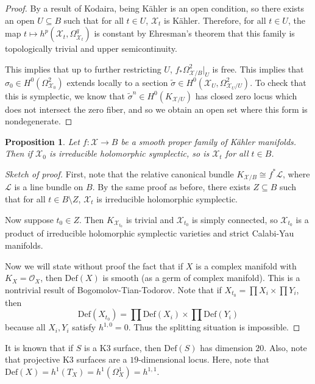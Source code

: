 \documentclass[leqno, openany]{memoir}
\newtheorem{prop}[thm]{Proposition}
\theoremstyle{definition}
\theoremstyle{remark}
\theoremstyle{plain}
\theoremstyle{definition}
\theoremstyle{remark}
\newcommand{\mc}[1]{\mathcal{#1}}
\newcommand{\mr}[1]{\mathrm{#1}}
\newcommand{\wt}[1]{\widetilde{#1}}
\begin{document}
\begin{proof}
    By a result of Kodaira, being K\"ahler is an open condition, so there exists an open $U \subseteq B$ such that for all $t \in U$, $\mc{X}_t$ is K\"ahler. Therefore, for all $t \in U$, the map $t \mapsto h^p(\mc{X}_t, \Omega_{\mc{X}_t}^q)$ is constant by Ehresman's theorem that this family is topologically trivial and upper semicontinuity.

    This implies that up to further restricting $U$, $f_* \Omega^2_{\mc{X}/B}|_U$ is free. This implies that $\sigma_0 \in H^0(\Omega^2_{\mc{X}_0})$ extends locally to a section $\wt{\sigma} \in H^0(\mc{X}_U, \Omega^2_{\mc{X}_U/U})$. To check that this is symplectic, we know that $\wt{\sigma}^n \in H^0(K_{\mc{X}/U})$ has closed zero locus which does not intersect the zero fiber, and so we obtain an open set where this form is nondegenerate.
\end{proof}

\begin{prop}
    Let $f \colon \mc{X} \to B$ be a smooth proper family of K\"ahler manifolds. Then if $\mc{X}_0$ is irreducible holomorphic symplectic, so is $\mc{X}_t$ for all $t \in B$.
\end{prop}

\begin{proof}[Sketch of proof]
    First, note that the relative canonical bundle $K_{\mc{X}/B} \cong f^* \mc{L}$, where $\mc{L}$ is a line bundle on $B$. By the same proof as before, there exists $Z \subseteq B$ such that for all $t \in B \setminus Z$, $\mc{X}_t$ is irreducible holomorphic symplectic.

    Now suppose $t_0 \in Z$. Then $K_{\mc{X}_{t_0}}$ is trivial and $\mc{X}_{t_0}$ is simply connected, so $\mc{X}_{t_0}$ is a product of irreducible holomorphic symplectic varieties and strict Calabi-Yau manifolds.

Now we will state without proof the fact that if $X$ is a complex manifold with $K_X = \mc{O}_X$, then $\mr{Def}(X)$ is smooth (as a germ of complex manifold). This is a nontrivial result of Bogomolov-Tian-Todorov. Note that if $X_{t_0} = \prod X_i \times \prod Y_i$, then
    \[ \mr{Def}(X_{t_0}) = \prod \mr{Def}(X_i) \times \prod \mr{Def}(Y_i) \]
    because all $X_i, Y_i$ satisfy $h^{1,0} = 0$. Thus the splitting situation is impossible.
\end{proof}

It is known that if $S$ is a K3 surface, then $\mr{Def}(S)$ has dimension $20$. Also, note that projective K3 surfaces are a $19$-dimensional locus. Here, note that $\mr{Def}(X) = h^1(T_X) = h^1(\Omega^1_X) = h^{1,1}$.
\end{document}
